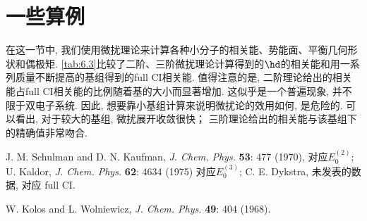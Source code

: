 \section{一些算例}
\label{sec6.8}
在这一节中, 
我们使用微扰理论来计算各种小分子的相关能、势能面、平衡几何形状和偶极矩. 
\autoref{tab:6.3}比较了二阶、三阶微扰理论计算得到的$\hd$的相关能和用一系列质量不断提高的基组得到的full CI相关能. 
值得注意的是, 
二阶理论给出的相关能占full CI相关能的比例随着基的大小而显著增加. 
这似乎是一个普遍现象, 并不限于双电子系统. 
因此, 想要靠小基组计算来说明微扰论的效用如何, 是危险的. 
可以看出, 对于较大的基组, 微扰展开收敛很快；
三阶理论给出的相关能与该基组下的精确值非常吻合. 
\begin{table}[H]
	\centering
	\caption{$R=1.4$时$\hd$的关联能(a.u.)}
	\begin{threeparttable}
		\begin{tablenotes}
			\item[a] J. M. Schulman and D. N. Kaufman, \textit{J. Chem. Phys.} \textbf{53}: 477 (1970), 对应$E_0^{(2)}$; U. Kaldor, \textit{J. Chem. Phys.} \textbf{62}: 4634 (1975) 对应$E_0^{(3)}$; C. E. Dykstra, 未发表的数据, 对应 full CI.
			\item[b] W. Kolos and L. Wolniewicz, \textit{J. Chem. Phys.} \textbf{49}: 404 (1968).
		\end{tablenotes}
	\end{threeparttable}
	\label{tab:6.3}
\end{table}
